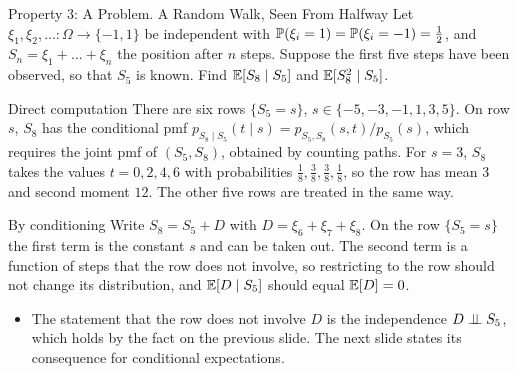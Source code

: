\begin{frame}{Property 3: A Problem. A Random Walk, Seen From Halfway}
  \small
  \label{rw}%
  Let $\xi_1,\xi_2,\dots\colon\Omega\to\{-1,1\}$ be independent with $\mathbb{P}(\xi_i=1)=\mathbb{P}(\xi_i=-1)=\tfrac12$, and $S_n=\xi_1+\dots+\xi_n$ the position after $n$ steps. Suppose the first five steps have been observed, so that $S_5$ is known. Find $\mathbb{E}[S_8\mid S_5]$ and $\mathbb{E}[S_8^2\mid S_5]$.
  \begin{block}{Direct computation}
    There are six rows $\{S_5=s\}$, $s\in\{-5,-3,-1,1,3,5\}$. On row $s$, $S_8$ has the conditional pmf $p_{S_8\mid S_5}(t\mid s)=p_{S_5,S_8}(s,t)/p_{S_5}(s)$, which requires the joint pmf of $(S_5,S_8)$, obtained by counting paths.
    For $s=3$, $S_8$ takes the values $t=0,2,4,6$ with probabilities $\tfrac18,\tfrac38,\tfrac38,\tfrac18$, so the row has mean $3$ and second moment $12$. The other five rows are treated in the same way.
  \end{block}
  \begin{block}{By conditioning}
    Write $S_8=S_5+D$ with $D=\xi_6+\xi_7+\xi_8$. On the row $\{S_5=s\}$ the first term is the constant $s$ and can be taken out. The second term is a function of steps that the row does not involve, so restricting to the row should not change its distribution, and $\mathbb{E}[D\mid S_5]$ should equal $\mathbb{E}[D]=0$.
  \end{block}
  \begin{itemize}
    \item The statement that the row does not involve $D$ is the independence $D\perp\!\!\!\perp S_5$, which holds by the fact on the previous slide. The next slide states its consequence for conditional expectations.
  \end{itemize}
\end{frame}

